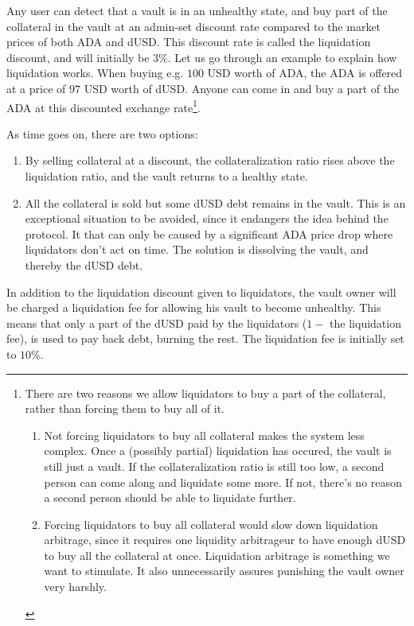 \documentclass{article} %
\begin{document}
Any user can detect that a vault is in an unhealthy state, and buy part of the
collateral in the vault at an admin-set discount rate compared to the market
prices of both ADA and dUSD.
This discount rate is called the liquidation discount, and will initially be
$3\%$.
Let us go through an example to explain how liquidation works.
When buying e.g. $100$ USD worth of ADA, the ADA is offered at a price of $97$
USD worth of dUSD.
Anyone can come in and buy a part of the ADA at this discounted exchange
rate\footnote{
  There are two reasons we allow liquidators to buy a part of the collateral,
  rather than forcing them to buy all of it.
  \begin{enumerate}
    \item Not forcing liquidators to buy all collateral makes the system less
      complex. Once a (possibly partial) liquidation has occured, the vault is
      still just a vault. If the collateralization ratio is still too low, a
      second person can come along and liquidate some more. If not, there's no
      reason a second person should be able to liquidate further.
    \item Forcing liquidators to buy all collateral would slow down liquidation
      arbitrage, since it requires one liquidity arbitrageur to have enough dUSD
      to buy all the collateral at once.
      Liquidation arbitrage is something we want to stimulate.
      It also unnecessarily assures punishing the vault owner very harshly.
  \end{enumerate}
}.

As time goes on, there are two options:
\begin{enumerate}
  \item By selling collateral at a discount, the collateralization ratio rises
    above the liquidation ratio, and the vault returns to a healthy state.
  \item All the collateral is sold but some dUSD debt remains in the vault.
    This is an exceptional situation to be avoided, since it endangers the idea
    behind the protocol.
    It that can only be caused by a significant ADA price drop where liquidators
    don't act on time.
    The solution is dissolving the vault, and thereby the dUSD debt.
\end{enumerate}

In addition to the liquidation discount given to liquidators, the vault owner
will be charged a liquidation fee for allowing his vault to become unhealthy.
This means that only a part of the dUSD paid by the liquidators ($1 - $ the
liquidation fee), is used to pay back debt, burning the rest.
The liquidation fee is initially set to $10\%$.
\end{document}
